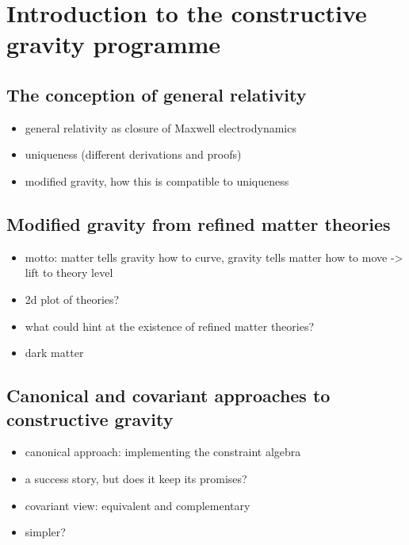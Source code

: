 \chapter{Introduction to the constructive gravity programme}

\section{The conception of general relativity}

\begin{itemize}
\item general relativity as closure of Maxwell electrodynamics
\item uniqueness (different derivations and proofs)
\item modified gravity, how this is compatible to uniqueness
\end{itemize}

\section{Modified gravity from refined matter theories}

\begin{itemize}
\item motto: matter tells gravity how to curve, gravity tells matter how to move -> lift to theory level
\item 2d plot of theories?
\item what could hint at the existence of refined matter theories?
\item dark matter
\end{itemize}

\section{Canonical and covariant approaches to constructive gravity}

\begin{itemize}
\item canonical approach: implementing the constraint algebra
\item a success story, but does it keep its promises?
\item covariant view: equivalent and complementary
\item simpler?
\end{itemize}
